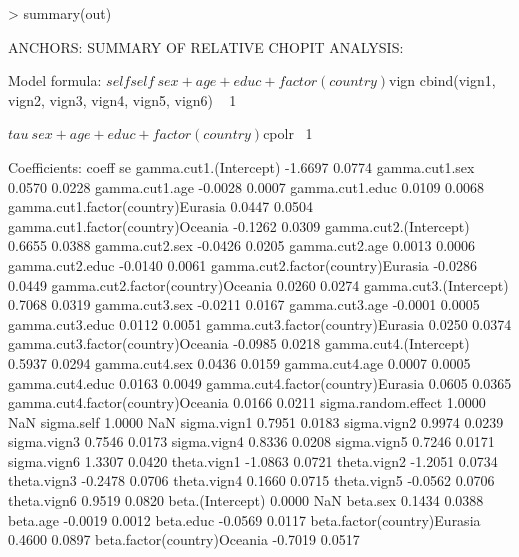 \documentclass{amsart}
\begin{document}
\begin{Schunk}
\begin{Sinput}
> summary(out)
\end{Sinput}
\begin{Soutput}
ANCHORS: SUMMARY OF RELATIVE CHOPIT ANALYSIS:

Model formula:
$self
self ~ sex + age + educ + factor(country)

$vign
cbind(vign1, vign2, vign3, vign4, vign5, vign6) ~ 1

$tau
~sex + age + educ + factor(country)

$cpolr
~1


Coefficients:
                                    coeff     se
gamma.cut1.(Intercept)            -1.6697 0.0774
gamma.cut1.sex                     0.0570 0.0228
gamma.cut1.age                    -0.0028 0.0007
gamma.cut1.educ                    0.0109 0.0068
gamma.cut1.factor(country)Eurasia  0.0447 0.0504
gamma.cut1.factor(country)Oceania -0.1262 0.0309
gamma.cut2.(Intercept)             0.6655 0.0388
gamma.cut2.sex                    -0.0426 0.0205
gamma.cut2.age                     0.0013 0.0006
gamma.cut2.educ                   -0.0140 0.0061
gamma.cut2.factor(country)Eurasia -0.0286 0.0449
gamma.cut2.factor(country)Oceania  0.0260 0.0274
gamma.cut3.(Intercept)             0.7068 0.0319
gamma.cut3.sex                    -0.0211 0.0167
gamma.cut3.age                    -0.0001 0.0005
gamma.cut3.educ                    0.0112 0.0051
gamma.cut3.factor(country)Eurasia  0.0250 0.0374
gamma.cut3.factor(country)Oceania -0.0985 0.0218
gamma.cut4.(Intercept)             0.5937 0.0294
gamma.cut4.sex                     0.0436 0.0159
gamma.cut4.age                     0.0007 0.0005
gamma.cut4.educ                    0.0163 0.0049
gamma.cut4.factor(country)Eurasia  0.0605 0.0365
gamma.cut4.factor(country)Oceania  0.0166 0.0211
sigma.random.effect                1.0000    NaN
sigma.self                         1.0000    NaN
sigma.vign1                        0.7951 0.0183
sigma.vign2                        0.9974 0.0239
sigma.vign3                        0.7546 0.0173
sigma.vign4                        0.8336 0.0208
sigma.vign5                        0.7246 0.0171
sigma.vign6                        1.3307 0.0420
theta.vign1                       -1.0863 0.0721
theta.vign2                       -1.2051 0.0734
theta.vign3                       -0.2478 0.0706
theta.vign4                        0.1660 0.0715
theta.vign5                       -0.0562 0.0706
theta.vign6                        0.9519 0.0820
beta.(Intercept)                   0.0000    NaN
beta.sex                           0.1434 0.0388
beta.age                          -0.0019 0.0012
beta.educ                         -0.0569 0.0117
beta.factor(country)Eurasia        0.4600 0.0897
beta.factor(country)Oceania       -0.7019 0.0517


\end{Soutput}
\end{Schunk}
\end{document}
